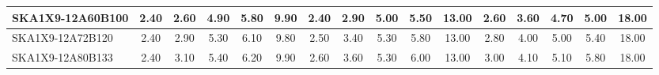 \begin{table}[H]
{{\begin{tabular}{|lccccc||ccccc||ccccc|}
SKA1X9-12A60B100 & 2.40 \cellcolor{blue!18.00} & 2.60 \cellcolor{red!18.00} & 4.90 \cellcolor{green!36.67} & 5.80 \cellcolor{orange!36.00} & 9.90 \cellcolor{purple!60.00} & 2.40 \cellcolor{blue!18.00} & 2.90 \cellcolor{red!25.64} & 5.00 \cellcolor{green!28.50} & 5.50 \cellcolor{orange!30.00} & 13.00 \cellcolor{purple!60.00} & 2.60 \cellcolor{blue!30.00} & 3.60 \cellcolor{red!33.75} & 4.70 \cellcolor{green!32.00} & 5.00 \cellcolor{orange!26.40} & 18.00 \cellcolor{purple!60.00}\\ \hline 
SKA1X9-12A72B120 & 2.40 \cellcolor{blue!18.00} & 2.90 \cellcolor{red!29.45} & 5.30 \cellcolor{green!55.33} & 6.10 \cellcolor{orange!54.00} & 9.80 \cellcolor{purple!51.60} & 2.50 \cellcolor{blue!24.00} & 3.40 \cellcolor{red!44.73} & 5.30 \cellcolor{green!60.00} & 5.80 \cellcolor{orange!48.00} & 13.00 \cellcolor{purple!60.00} & 2.80 \cellcolor{blue!42.00} & 4.00 \cellcolor{red!54.75} & 5.00 \cellcolor{green!53.00} & 5.40 \cellcolor{orange!43.20} & 18.00 \cellcolor{purple!60.00}\\ \hline 
SKA1X9-12A80B133 & 2.40 \cellcolor{blue!18.00} & 3.10 \cellcolor{red!37.09} & 5.40 \cellcolor{green!60.00} & 6.20 \cellcolor{orange!60.00} & 9.90 \cellcolor{purple!60.00} & 2.60 \cellcolor{blue!30.00} & 3.60 \cellcolor{red!52.36} & 5.30 \cellcolor{green!60.00} & 6.00 \cellcolor{orange!60.00} & 13.00 \cellcolor{purple!60.00} & 3.00 \cellcolor{blue!54.00} & 4.10 \cellcolor{red!60.00} & 5.10 \cellcolor{green!60.00} & 5.80 \cellcolor{orange!60.00} & 18.00 \cellcolor{purple!60.00}\\ \hline 
\end{tabular}}
\vspace{-0.300000cm}
\hspace{1cm} 
}
\end{table}

